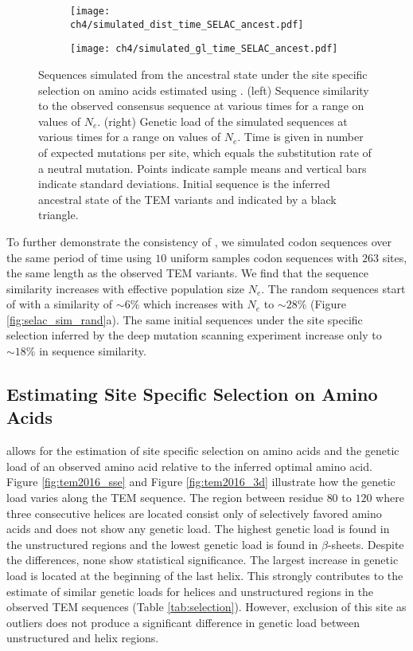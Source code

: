 \begin{figure}[h]
    \centering
    \begin{subfigure}
        \centering
        \texttt{[image: ch4/simulated\_dist\_time\_SELAC\_ancest.pdf]}
    \end{subfigure}
    \begin{subfigure}
        \centering
        \texttt{[image: ch4/simulated\_gl\_time\_SELAC\_ancest.pdf]}
    \end{subfigure}
    \caption{Sequences simulated from the ancestral state under the site specific selection on amino acids estimated using \selac. 
    (left) Sequence similarity to the observed consensus sequence at various times for a range on values of $N_e$.
    (right) Genetic load of the simulated sequences at various times for a range on values of $N_e$.
    Time is given in number of expected mutations per site, which equals the substitution rate of a neutral mutation.
    Points indicate sample means and vertical bars indicate standard deviations. Initial sequence is the inferred ancestral state of the TEM variants and indicated by a black triangle.}
    \label{fig:selac_sim}
\end{figure}

To further demonstrate the consistency of \selac, we simulated codon sequences over the same period of time using $10$ uniform samples codon sequences with $263$ sites, the same length as the observed TEM variants.
We find that the sequence similarity increases with effective population size $N_e$.
The random sequences start of with a similarity of $\sim6 \%$ which increases with $N_e$ to $\sim28 \%$ (Figure \ref{fig:selac_sim_rand}a).
The same initial sequences under the site specific selection inferred by the deep mutation scanning experiment increase only to $\sim18 \%$ in sequence similarity.



\subsection{Estimating Site Specific Selection on Amino Acids}
\selac allows for the estimation of site specific selection on amino acids and the genetic load of an observed amino acid relative to the inferred optimal amino acid.
Figure \ref{fig:tem2016_sse} and Figure \ref{fig:tem2016_3d} illustrate how the genetic load varies along the TEM sequence.
The region between residue $80$ to $120$ where three consecutive helices are located consist only of selectively favored amino acids and does not show any genetic load. 
The highest genetic load is found in the unstructured regions and the lowest genetic load is found in $\beta$-sheets.
Despite the differences, none show statistical significance.
The largest increase in genetic load is located at the beginning of the last helix.
This strongly contributes to the estimate of similar genetic loads for helices and unstructured regions in the observed TEM sequences (Table \ref{tab:selection}).
However, exclusion of this site as outliers does not produce a significant difference in genetic load between unstructured and helix regions.

